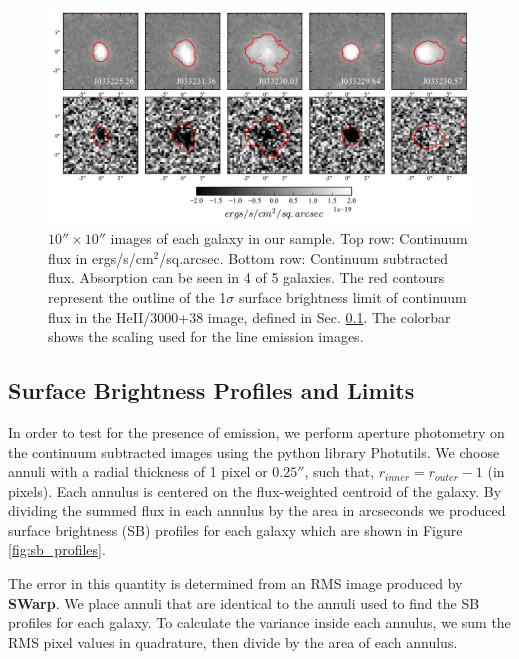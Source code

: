 \documentclass[twocolumn]{aastex61}
\begin{document}
\begin{figure}[!htb]
\centering
\includegraphics[scale=0.7]{../Figures/stamps.pdf}
\caption{ $10'' \times 10''$ images of each galaxy in our sample. Top row: Continuum flux in ergs/s/cm$^2$/sq.arcsec. Bottom row: Continuum subtracted  flux.  Absorption can be seen in 4 of 5 galaxies. The red contours represent the outline of the 1$\sigma$ surface brightness limit of continuum flux in the HeII/3000+38 image, defined in Sec. \ref{sec.sb}. The colorbar shows the scaling used for the line emission images.}
\label{fig:stamp_images}
\end{figure}

\subsection{Surface Brightness Profiles and Limits}\label{sec.sb}

In order to test for the presence of  emission, we perform aperture photometry on the continuum subtracted images using the python library Photutils. We choose annuli with a radial thickness of 1 pixel or $0.25 ''$, such that, $r_{inner}=r_{outer}-1$ (in pixels). Each annulus is centered on the flux-weighted centroid of the galaxy. By dividing the summed flux in each annulus by the area in arcseconds we produced surface brightness (SB) profiles for each galaxy which are shown in Figure \ref{fig:sb_profiles}. 

The error in this quantity is determined from an RMS image produced by \textbf{SWarp}. We place annuli that are identical to the annuli used to find the SB profiles for each galaxy. To calculate the variance inside each annulus, we sum the RMS pixel values in quadrature, then divide by the area of each annulus. 
\end{document}
